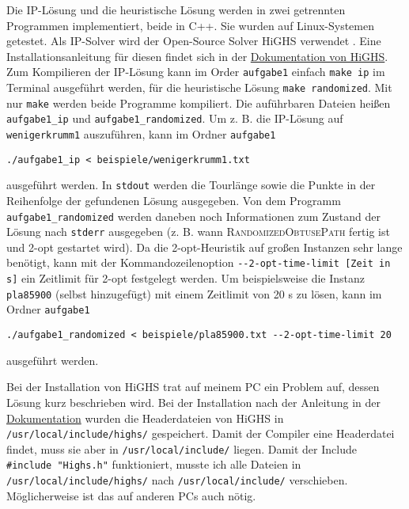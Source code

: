 \documentclass[a4paper, 10pt, ngerman]{article}
\begin{document}
Die IP-Lösung und die heuristische Lösung werden in zwei getrennten Programmen implementiert, beide in C++. Sie wurden auf Linux-Systemen getestet. Als IP-Solver wird der Open-Source Solver HiGHS verwendet \cite{highs}. Eine Installationsanleitung für diesen findet sich in der \href{https://ergo-code.github.io/HiGHS/dev/cpp/get-started/}{Dokumentation von HiGHS}. Zum Kompilieren der IP-Lösung kann im Order \verb|aufgabe1| einfach \verb|make ip| im Terminal ausgeführt werden, für die heuristische Lösung \verb|make randomized|. Mit nur \verb|make| werden beide Programme kompiliert. Die auführbaren Dateien heißen \verb|aufgabe1_ip| und \verb|aufgabe1_randomized|. Um z. B. die IP-Lösung auf \verb|wenigerkrumm1| auszuführen, kann im Ordner \verb|aufgabe1|

\medskip
\verb|./aufgabe1_ip < beispiele/wenigerkrumm1.txt|
\medskip

\noindent ausgeführt werden. In \verb|stdout| werden die Tourlänge sowie die Punkte in der Reihenfolge der gefundenen Lösung ausgegeben. Von dem Programm \verb|aufgabe1_randomized| werden daneben noch Informationen zum Zustand der Lösung nach \verb|stderr| ausgegeben (z. B. wann \textsc{RandomizedObtusePath} fertig ist und 2-opt gestartet wird). Da die 2-opt-Heuristik auf großen Instanzen sehr lange benötigt, kann mit der Kommandozeilenoption \verb|--2-opt-time-limit [Zeit in s]| ein Zeitlimit für 2-opt festgelegt werden. Um beispielsweise die Instanz \verb|pla85900| (selbst hinzugefügt) mit einem Zeitlimit von 20 s zu lösen, kann im Ordner \verb|aufgabe1|

\medskip
\verb|./aufgabe1_randomized < beispiele/pla85900.txt --2-opt-time-limit 20|
\medskip

ausgeführt werden.

Bei der Installation von HiGHS trat auf meinem PC ein Problem auf, dessen Lösung kurz beschrieben wird. Bei der Installation nach der Anleitung in der \href{https://ergo-code.github.io/HiGHS/dev/}{Dokumentation} wurden die Headerdateien von HiGHS in \verb|/usr/local/include/highs/| gespeichert. Damit der Compiler eine Headerdatei findet, muss sie aber in \verb|/usr/local/include/| liegen. Damit der Include \verb|#include "Highs.h"| funktioniert, musste ich alle Dateien in \verb|/usr/local/include/highs/| nach \verb|/usr/local/include/| verschieben. Möglicherweise ist das auf anderen PCs auch nötig.
\end{document}
